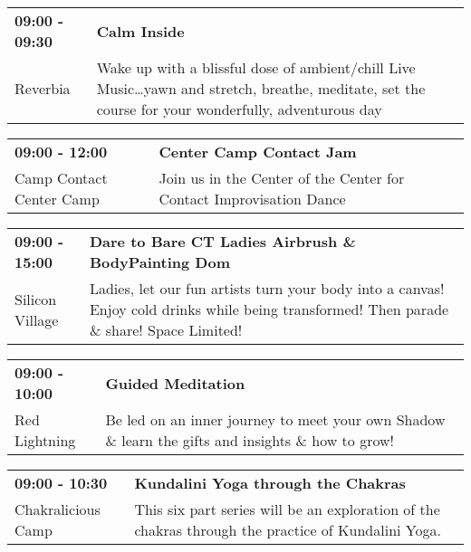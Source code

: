 \begin{tabular}{ p{1in} p{2.2in} }
    \textbf{09:00 - 09:30} & \textbf{Calm Inside} \\
    Reverbia \newline  & Wake up with a blissful dose of ambient/chill Live Music\ldots yawn and stretch, breathe, meditate, set the course for your wonderfully, adventurous day \\
    \hline 
\end{tabular}
    
\begin{tabular}{ p{1in} p{2.2in} }
    \textbf{09:00 - 12:00} & \textbf{Center Camp Contact Jam} \\
    Camp Contact \newline Center Camp & Join us in the Center of the Center for Contact Improvisation Dance \\
    \hline 
\end{tabular}
    
\begin{tabular}{ p{1in} p{2.2in} }
    \textbf{09:00 - 15:00} & \textbf{Dare to Bare CT Ladies Airbrush \& BodyPainting Dom} \\
    Silicon Village \newline  & Ladies, let our fun artists turn your body into a canvas! Enjoy cold drinks while being transformed! Then parade \& share! Space Limited! \\
    \hline 
\end{tabular}
    
\begin{tabular}{ p{1in} p{2.2in} }
    \textbf{09:00 - 10:00} & \textbf{Guided Meditation} \\
    Red Lightning \newline  & Be led on an inner journey to meet your own Shadow \& learn the gifts and insights \& how to grow! \\
    \hline 
\end{tabular}
    
\begin{tabular}{ p{1in} p{2.2in} }
    \textbf{09:00 - 10:30} & \textbf{Kundalini Yoga through the Chakras} \\
    Chakralicious Camp \newline  & This six part series will be an exploration of the chakras through the practice of Kundalini Yoga. \\
    \hline 
\end{tabular}
    
